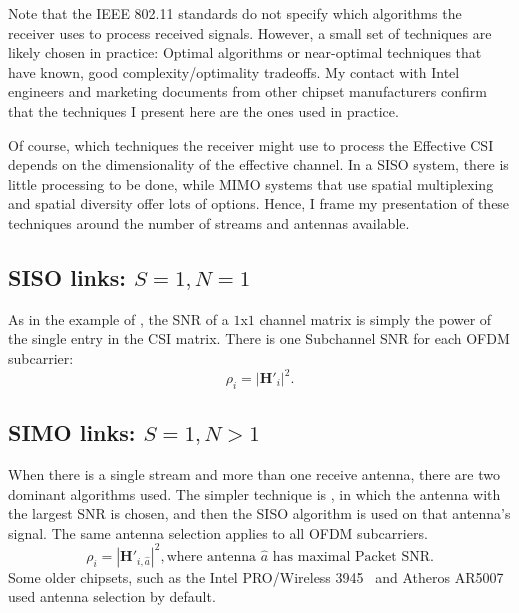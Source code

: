 Note that the IEEE 802.11 standards do not specify which algorithms the receiver uses to process received signals. However, a small set of techniques are likely chosen in practice: Optimal algorithms or near-optimal techniques that have known, good complexity/optimality tradeoffs. My contact with Intel engineers and marketing documents from other chipset manufacturers confirm that the techniques I present here are the ones used in practice.

Of course, which techniques the receiver might use to process the Effective CSI depends on the dimensionality of the effective channel. In a SISO system, there is little processing to be done, while MIMO systems that use spatial multiplexing and spatial diversity offer lots of options. Hence, I frame my presentation of these techniques around the number of streams and antennas available.

\subsection{SISO links: $S=1,N=1$}
As in the example of , the SNR of a $1$x$1$ channel matrix is simply the power of the single entry in the CSI matrix. There is one Subchannel SNR for each OFDM subcarrier:
\begin{equation}
	\rho_i = \left| \mathbf{H}'_i \right|^2.
\end{equation}

\subsection{SIMO links: $S=1,N>1$}
When there is a single stream and more than one receive antenna, there are two dominant algorithms used. The simpler technique is , in which the antenna with the largest SNR is chosen, and then the SISO algorithm is used on that antenna's signal. The same antenna selection applies to all OFDM subcarriers.
\begin{equation}
	\rho_i = \left| \mathbf{H}'_{i,\hat{a}} \right|^2, \text{where antenna } \hat{a} \text{ has maximal Packet SNR}.
\end{equation}
Some older chipsets, such as the Intel PRO/Wireless 3945~\cite[\S3.5]{ipw3945} and Atheros AR5007~\cite{madwifi_diversity} used antenna selection by default.


